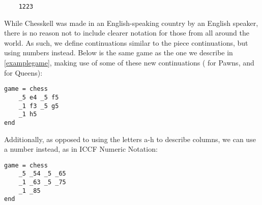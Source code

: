 \begin{verbatim}
    1223
\end{verbatim}

While Chesskell was made in an English-speaking country by an English speaker, there is no reason not to include clearer notation for those from all around the world. As such, we define continuations similar to the piece continuations, but using numbers instead. Below is the same game as the one we describe in \cref{examplegame}, making use of some of these new continuations ( for Pawns, and  for Queens):

\begin{lstlisting}
game = chess
    _5 e4 _5 f5
    _1 f3 _5 g5
    _1 h5
end
\end{lstlisting}

Additionally, as opposed to using the letters a-h to describe columns, we can use a number instead, as in ICCF Numeric Notation:

\begin{lstlisting}
game = chess
    _5 _54 _5 _65
    _1 _63 _5 _75
    _1 _85
end
\end{lstlisting}
